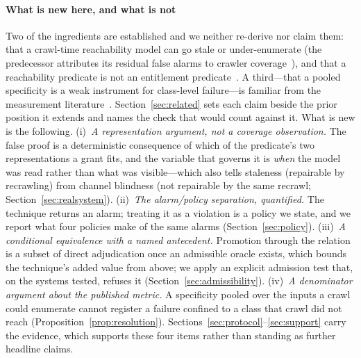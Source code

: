 \paragraph{What is new here, and what is not}
Two of the ingredients are established and we neither re-derive nor claim them: that
a crawl-time reachability model can go stale or under-enumerate (the predecessor
attributes its residual false alarms to crawler coverage~\cite{Mai2019Metamorphic}),
and that a reachability predicate is not an entitlement
predicate~\cite{Chaleshtari2022Metamorphic}. A third---that a pooled specificity is a
weak instrument for class-level failure---is familiar from the measurement
literature~\cite{Croft2023Data}. Section~\ref{sec:related} sets each claim beside the
prior position it extends and names the check that would count against it. What is
new is the following.
(i)~\emph{A representation argument, not a coverage observation.} The false proof is
a deterministic consequence of which of the predicate's two representations a grant
fits, and the variable that governs it is \emph{when} the model was read rather than
what was visible---which also tells staleness (repairable by recrawling) from channel
blindness (not repairable by the same recrawl;
Section~\ref{sec:realsystem}). (ii)~\emph{The alarm/policy separation, quantified.}
The technique returns an alarm; treating it as a violation is a policy we state, and
we report what four policies make of the same alarms
(Section~\ref{sec:policy}). (iii)~\emph{A conditional equivalence with a named
antecedent.} Promotion through the relation is a subset of direct adjudication once
an admissible oracle exists, which bounds the technique's added value from above; we
apply an explicit admission test that, on the systems tested, refuses it
(Section~\ref{sec:admissibility}). (iv)~\emph{A denominator argument about the
published metric.} A specificity pooled over the inputs a crawl could enumerate
cannot register a failure confined to a class that crawl did not reach
(Proposition~\ref{prop:resolution}).
Sections~\ref{sec:protocol}--\ref{sec:support} carry the evidence, which supports
these four items rather than standing as further headline claims.
